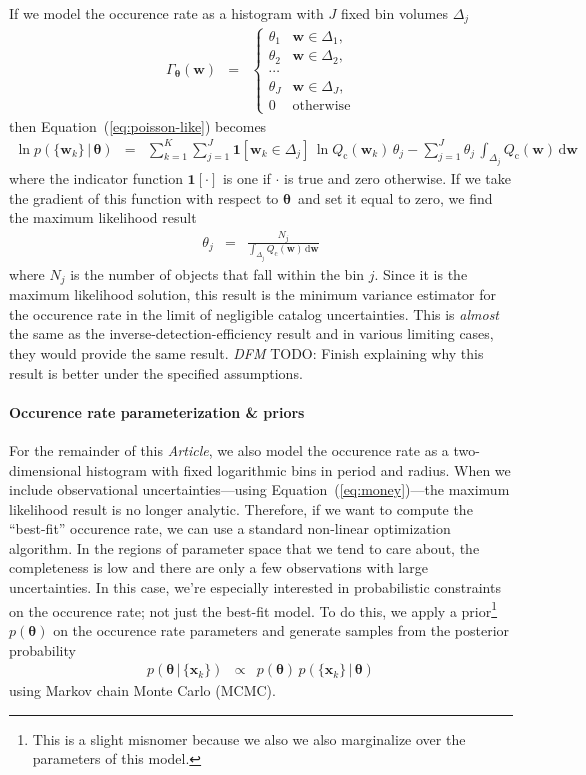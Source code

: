 \documentclass[12pt,preprint]{aastex}
\newcommand{\paper}{\textsl{Article}}
\newcommand{\Eq}[1]{Equation~(\ref{eq:#1})}
\newcommand{\eq}[1]{\Eq{#1}}
\newcommand{\eqlabel}[1]{\label{eq:#1}}
\newcommand{\dd}{\ensuremath{\,\mathrm{d}}}
\newcommand{\bvec}[1]{\ensuremath{\boldsymbol{#1}}}
\newcommand{\todo}[3]{{\color{#2} \emph{#1} TODO: #3}}
\newcommand{\dfmtodo}[1]{\todo{DFM}{red}{#1}}
\newcommand{\rate}{\ensuremath{\Gamma}}
\newcommand{\ratepar}{{\ensuremath{\theta}}}
\newcommand{\ratepars}{{\ensuremath{\bvec{\ratepar}}}}
\newcommand{\completeness}{{\ensuremath{Q_\mathrm{c}}}}
\newcommand{\data}{{\ensuremath{\bvec{x}}}}
\newcommand{\entry}{{\ensuremath{\bvec{w}}}}
\newcommand{\binarea}{{\ensuremath{\Delta}}}
\begin{document}
If we model the occurence rate as a histogram with $J$ fixed bin volumes
$\binarea_j$
\begin{eqnarray}
\rate_\ratepars (\entry) &=& \left\{\begin{array}{ll}
\ratepar_1 & \entry \in \binarea_1,\\
\ratepar_2 & \entry \in \binarea_2,\\
\cdots \\
\ratepar_J & \entry \in \binarea_J,\\
0 & \mathrm{otherwise}
\end{array}\right.
\end{eqnarray}
then \eq{poisson-like} becomes
\begin{eqnarray}
\ln p(\{\entry_k\}\,|\,\ratepars) &=&
    \sum_{k=1}^K \sum_{j=1}^J \mathbf{1}[\entry_k \in
        \binarea_j]\,\ln\completeness(\entry_k)\,\ratepar_j
    -\sum_{j=1}^J\ratepar_j\,\int_{\binarea_j} \completeness(\entry)\dd\entry
\end{eqnarray}
where the indicator function $\mathbf{1}[\cdot]$ is one if $\cdot$ is true and
zero otherwise.
If we take the gradient of this function with respect to \ratepars\ and set it
equal to zero, we find the maximum likelihood result
\begin{eqnarray}
\ratepar_j &=& \frac{N_j}{\int_{\binarea_j} \completeness(\entry)\dd\entry}
\end{eqnarray}
where $N_j$ is the number of objects that fall within the bin $j$.
Since it is the maximum likelihood solution, this result is the minimum
variance estimator for the occurence rate in the limit of negligible catalog
uncertainties.
This is \emph{almost} the same as the inverse-detection-efficiency result and
in various limiting cases, they would provide the same result.
\dfmtodo{Finish explaining why this result is better under the specified
assumptions.}

\paragraph{Occurence rate parameterization \& priors}
For the remainder of this \paper, we also model the occurence rate as a
two-dimensional histogram with fixed logarithmic bins in period and radius.
When we include observational uncertainties---using \eq{money}---the maximum
likelihood result is no longer analytic.
Therefore, if we want to compute the ``best-fit'' occurence rate, we can use a
standard non-linear optimization algorithm.
In the regions of parameter space that we tend to care about, the completeness
is low and there are only a few observations with large uncertainties.
In this case, we're especially interested in probabilistic constraints on the
occurence rate; not just the best-fit model.
To do this, we apply a prior\footnote{This is a slight misnomer because
we also we also marginalize over the parameters of this model.} $p(\ratepars)$
on the occurence rate parameters and generate samples from the posterior
probability
\begin{eqnarray}\eqlabel{posterior}
p(\ratepars\,|\,\{\data_k\}) &\propto&
    p(\ratepars)\,p(\{\data_k\}\,|\,\ratepars)
\end{eqnarray}
using Markov chain Monte Carlo (MCMC).
\end{document}
